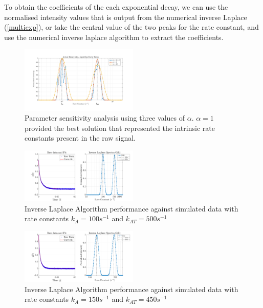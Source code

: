 To obtain the coefficients of the each exponential decay, we can use the normalised intensity values that is output from the numerical inverse Laplace (\autoref{multiexp}), or take the central value of the two peaks for the rate constant, and use the numerical inverse laplace algorithm to extract the coefficients.
\begin{figure}[H]
    \centering
    \includegraphics[width = 0.5\textwidth]{img/alpha_testing_annotate.png}
    \caption{Parameter sensitivity analysis using three values of $\alpha$. $\alpha = 1$ provided the best solution that represented the intrinsic rate constants present in the raw signal.}
    \label{alpha}
\end{figure}
\begin{figure}[H]
    \centering
    \includegraphics[width = 0.5\textwidth]{img/Inv_Laplace_results.png}
    \caption{Inverse Laplace Algorithm performance against simulated data with rate constants $k_{A} = 100s^{-1}$ and $k_{AT} = 500s^{-1}$}
    \label{multiexp}
\end{figure}
\begin{figure}[H]
    \centering
    \includegraphics[width = 0.5\textwidth]{img/Inv_laplace_150_450.png}
    \caption{Inverse Laplace Algorithm performance against simulated data with rate constants $k_{A} = 150s^{-1}$ and $k_{AT} = 450s^{-1}$}
    \label{multiexp_2}
\end{figure}
